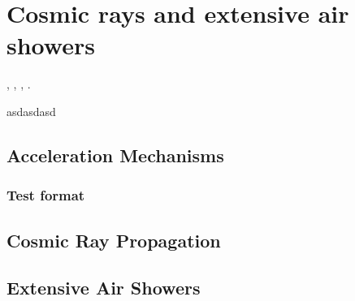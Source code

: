 
\chapter{Cosmic rays and extensive air showers}
\label{chap:cosmic-rays}

\cite{Roulet2015}, \cite{Hu2014}, \cite{Chouqar2020}
\cite{Kubyshkina2020}, \cite{Zhang2017}.
\blindtext

asdasdasd

\section{Acceleration Mechanisms}

\blindtext

\subsection{Test format}

\blindtext

\section{Cosmic Ray Propagation}

\blindtext

\section{Extensive Air Showers}

\blindtext